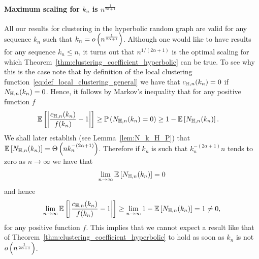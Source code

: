 \paragraph{Maximum scaling for $k_n$ is $n^{\frac{1}{2\alpha +1}}$}
All our results for clustering in the hyperbolic random graph are valid for any sequence $k_n$ such that $k_n = o\left(n^{\frac{1}{2\alpha + 1}}\right)$. Although one would like to have results for any sequence $k_n \le n$, it turns out that $n^{1/(2\alpha + 1)}$ is the optimal scaling for which Theorem~\ref{thm:clustering_coefficient_hyperbolic} can be true. To see why this is the case note that by definition of the local clustering function~\eqref{eq:def_local_clustering_general} we have that $c_{\mathbb{H},n}(k_n) = 0$ if $N_{\mathbb{H},n}(k_n) = 0$. Hence, it follows by Markov's inequality that for any positive function $f$
\begin{align*}
	\mathbb{E}\left[\left|\frac{c_{\mathbb{H},n}(k_n)}{f(k_n)} - 1\right|\right] 
	&\ge \mathbb{P}\left(N_{\mathbb{H},n}(k_n) = 0\right) \ge 1 - \mathbb{E}\left[N_{\mathbb{H},n}(k_n)\right].
\end{align*}
We shall later establish (see Lemma~\ref{lem:N_k_H_P}) that $\mathbb{E}\left[N_{\mathbb{H},n}(k_n)\right] = \Theta\left(n k_n^{-(2\alpha + 1)}\right)$. Therefore if $k_n$ is such that $k_n^{-(2\alpha + 1)} n$ tends to zero as $n \to \infty$ we have that 
\[
	\lim_{n \to \infty} \mathbb{E}\left[N_{\mathbb{H},n}(k_n)\right] = 0
\]
and hence
\[
	\lim_{n \to \infty} \mathbb{E}\left[\left|\frac{c_{\mathbb{H},n}(k_n)}{f(k_n)} - 1\right|\right] 
	\ge \lim_{n \to \infty} 1 - \mathbb{E}\left[N_{\mathbb{H},n}(k_n)\right] = 1 \ne 0,
\]
for any positive function $f$. This implies that we cannot expect a result like that of Theorem~\ref{thm:clustering_coefficient_hyperbolic} to hold as soon as $k_n$ is not $o\left(n^{\frac{1}{2\alpha + 1}}\right)$.




